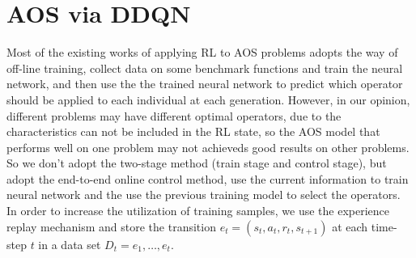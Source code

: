 \documentclass[journal]{IEEEtran}
\begin{document}
\section{AOS via DDQN}
Most of the existing works of applying RL to AOS problems adopts the way of off-line training, collect data on some benchmark functions and train the neural network, and then use the the trained neural network to predict which operator should be applied to each individual at each generation.
% 
However, in our opinion, different problems may have different optimal operators, due to the characteristics can not be included in the RL state, so the AOS model that performs well on one problem may not achieveds good results on other problems.
So we don't adopt the two-stage method (train stage and control stage), but adopt the end-to-end online control method, use the current information to train neural network and the use the previous training model to select the operators.
In order to increase the utilization of training samples, we use the experience replay mechanism \cite{ddqn} and store the transition $e_t = (s_t,a_t,r_t,s_{t+1})$ at each time-step $t$ in a data set $D_t = {e_1,\dots, e_t}$.

\end{document}
